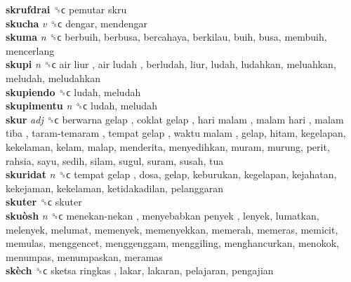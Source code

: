 \textbf{skrufdrai} ␝ϲ   pemutar skru   \\
\textbf{skucha} \emph{v}  ␝ϲ  dengar, mendengar  \\
\textbf{skuma} \emph{n}  ␝ϲ  berbuih, berbusa, bercahaya, berkilau, buih, busa, membuih, mencerlang  \\
\textbf{skupi} \emph{n}  ␝ϲ   air liur ,  air ludah , berludah, liur, ludah, ludahkan, meluahkan, meludah, meludahkan  \\
\textbf{skupiendo} ␝ϲ  ludah, meludah  \\
\textbf{skupimentu} \emph{n}  ␝ϲ  ludah, meludah  \\
\textbf{skur} \emph{adj}  ␝ϲ   berwarna gelap ,  coklat gelap ,  hari malam ,  malam hari ,  malam tiba ,  taram-temaram ,  tempat gelap ,  waktu malam , gelap, hitam, kegelapan, kekelaman, kelam, malap, menderita, menyedihkan, muram, murung, perit, rahsia, sayu, sedih, silam, sugul, suram, susah, tua  \\
\textbf{skuridat} \emph{n}  ␝ϲ   tempat gelap , dosa, gelap, keburukan, kegelapan, kejahatan, kekejaman, kekelaman, ketidakadilan, pelanggaran  \\
\textbf{skuter} ␝ϲ  skuter  \\
\textbf{skuòsh} \emph{n}  ␝ϲ   menekan-nekan ,  menyebabkan penyek , lenyek, lumatkan, melenyek, melumat, memenyek, memenyekkan, memerah, memeras, memicit, memulas, menggencet, menggenggam, menggiling, menghancurkan, menokok, menumpas, menumpaskan, meramas  \\
\textbf{skèch} ␝ϲ   sketsa ringkas , lakar, lakaran, pelajaran, pengajian  \\
